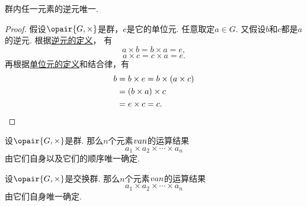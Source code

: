 \begin{theorem}\label{theorem:抽象代数.群内任一元的逆元唯一}
群内任一元素的逆元唯一.
\begin{proof}
假设\(\opair{G,\times}\)是群，\(e\)是它的单位元.
任意取定\(a \in G\).
又假设\(b\)和\(c\)都是\(a\)的逆元.
根据\hyperref[definition:抽象代数.群的定义]{逆元的定义}，
有\[
    a \times b = b \times a = e,
\]\[
    a \times c = c \times a = e.
\]
再根据\hyperref[definition:抽象代数.幺半群的定义]{单位元的定义}和结合律，有\begin{align*}
    b &= b \times e
	= b \times (a \times c) \\
    &= (b \times a) \times c \\
    &= e \times c
	= c.
	\qedhere
\end{align*}
\end{proof}
\end{theorem}

\begin{theorem}
设\(\opair{G,\times}\)是群.
那么\(n\)个元素\(v{a}{n}\)的运算结果\[
	a_1 \times a_2 \times \dotsb \times a_n
\]由它们自身以及它们的顺序唯一确定.
\end{theorem}

\begin{corollary}
设\(\opair{G,\times}\)是交换群.
那么\(n\)个元素\(v{a}{n}\)的运算结果\[
	a_1 \times a_2 \times \dotsb \times a_n
\]由它们自身唯一确定.
\end{corollary}
